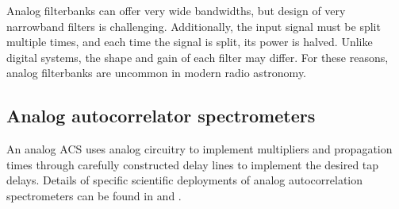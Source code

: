\documentclass{ws-rv961x669}
\begin{document}
Analog filterbanks can offer very wide bandwidths, but design of very narrowband filters is challenging. Additionally, the input signal must be split multiple times, and each time the signal is split, its power is halved. Unlike digital systems, the shape and gain of each filter may differ. For these reasons, analog filterbanks are uncommon in modern radio astronomy.

\subsection{Analog autocorrelator spectrometers}\label{sub:analog-acs}






An analog ACS uses analog circuitry to implement multipliers and propagation times through carefully constructed delay lines to implement the desired tap delays. 
Details of specific scientific deployments of analog autocorrelation spectrometers can be found in \cite{Erickson2007} and \cite{Harris1998}.
\end{document}
